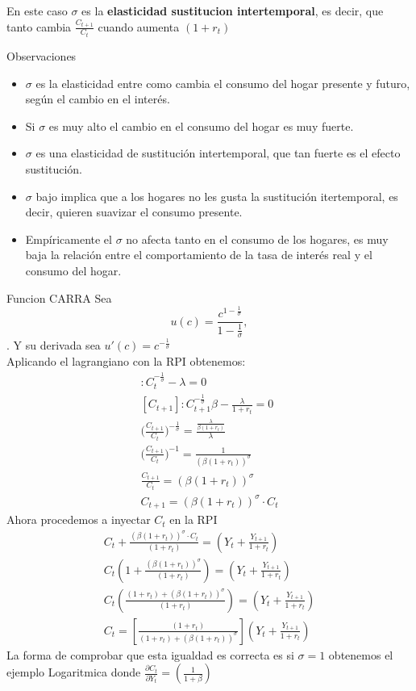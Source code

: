 \documentclass[12pt]{article}
\begin{document}
En este caso $\sigma$ es la \textbf{elasticidad sustitucion intertemporal}, es decir, que tanto cambia $\frac{C_{t+1}}{C_t}$ cuando aumenta $(1+r_t)$\\

\begin{importante}{Observaciones}
    \begin{itemize}
    \item $\sigma$ es la elasticidad entre como cambia el consumo del hogar presente y futuro, según el cambio en el interés. 
    \item Si $\sigma$ es muy alto el cambio en el consumo del hogar es muy fuerte. 
    \item $\sigma$ es una elasticidad de sustitución intertemporal, que tan fuerte es el efecto sustitución. 
    \item $\sigma$ bajo implica que a los hogares no les gusta la sustitución itertemporal, es decir, quieren suavizar el consumo presente. 
    \item Empíricamente el $\sigma$ no afecta tanto en el consumo de los hogares, es muy baja la relación entre el comportamiento de la tasa de interés real y el consumo del hogar. 
\end{itemize}
\end{importante} 
\begin{ejemplo}{Funcion CARRA}
    Sea $$u(c)=\frac{c^{1-\frac{1}{\sigma}}}{1-\frac{1}{\sigma}},$$. Y su derivada sea $u'(c)=c^{-\frac{1}{\sigma}}$\\
    Aplicando el lagrangiano con la RPI obtenemos:
    \begin{align*}
        [C_t]: C_t^{-\frac{1}{\sigma}}-\lambda=0\\
        [C_{t+1}]: C_{t+1}^{-\frac{1}{\sigma}}\beta-\frac{\lambda}{1+r_t}=0\\
        {(\frac{C_{t+1}}{C_{t}}})^{-\frac{1}{\sigma}}=\frac{\frac{\lambda}{\beta(1+r_t)}}{\lambda}\\
        {(\frac{C_{t+1}}{C_t}})^{-{1}}=\frac{1}{(\beta(1+r_t))^\sigma}\\
        \frac{C_{t+1}}{C_t}={(\beta(1+r_t))^\sigma}\\
        C_{t+1}={(\beta(1+r_t))^\sigma} \cdot C_t
    \end{align*}
    Ahora procedemos a inyectar $C_t$ en la RPI
    \begin{align*}
        C_t+\frac{{(\beta(1+r_t))^\sigma} \cdot C_t}{(1+r_t)}=(Y_t+\frac{Y_{t+1}}{1+r_t})\\
        C_t(1+\frac{{(\beta(1+r_t))^\sigma}}{(1+r_t)})=(Y_t+\frac{Y_{t+1}}{1+r_t})\\
        C_t(\frac{(1+r_t)+(\beta(1+r_t))^\sigma}{(1+r_t)})=(Y_t+\frac{Y_{t+1}}{1+r_t})\\
        C_t=[\frac{(1+r_t)}{(1+r_t)+(\beta(1+r_t))^\sigma}](Y_t+\frac{Y_{t+1}}{1+r_t})
    \end{align*}
    La forma de comprobar que esta igualdad es correcta es si $\sigma=1$ obtenemos el ejemplo Logaritmica donde $\frac{\partial C_t}{\partial Y_t}=(\frac{1}{1+\beta})$
\end{ejemplo}
\end{document}
